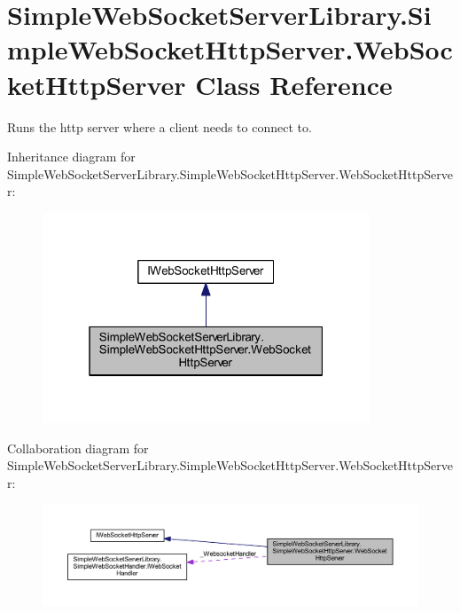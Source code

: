 \hypertarget{class_simple_web_socket_server_library_1_1_simple_web_socket_http_server_1_1_web_socket_http_server}{}\section{Simple\+Web\+Socket\+Server\+Library.\+Simple\+Web\+Socket\+Http\+Server.\+Web\+Socket\+Http\+Server Class Reference}
\label{class_simple_web_socket_server_library_1_1_simple_web_socket_http_server_1_1_web_socket_http_server}


Runs the http server where a client needs to connect to.  




Inheritance diagram for Simple\+Web\+Socket\+Server\+Library.\+Simple\+Web\+Socket\+Http\+Server.\+Web\+Socket\+Http\+Server\+:
\nopagebreak
\begin{figure}[H]
\begin{center}
\leavevmode
\includegraphics[width=277pt]{class_simple_web_socket_server_library_1_1_simple_web_socket_http_server_1_1_web_socket_http_server__inherit__graph}
\end{center}
\end{figure}


Collaboration diagram for Simple\+Web\+Socket\+Server\+Library.\+Simple\+Web\+Socket\+Http\+Server.\+Web\+Socket\+Http\+Server\+:
\nopagebreak
\begin{figure}[H]
\begin{center}
\leavevmode
\includegraphics[width=350pt]{class_simple_web_socket_server_library_1_1_simple_web_socket_http_server_1_1_web_socket_http_server__coll__graph}
\end{center}
\end{figure}
